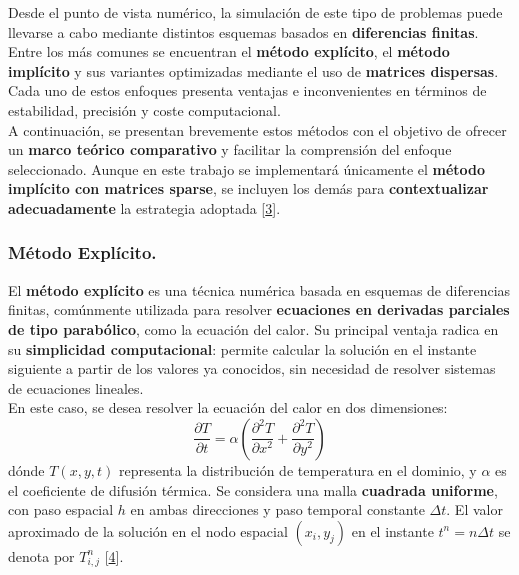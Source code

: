 \documentclass{article}
\begin{document}
Desde el punto de vista numérico, la simulación de este tipo de problemas puede llevarse a cabo mediante distintos esquemas basados en \textbf{diferencias finitas}. Entre los más comunes se encuentran el \textbf{método explícito}, el \textbf{método implícito} y sus variantes optimizadas mediante el uso de \textbf{matrices dispersas}. Cada uno de estos enfoques presenta ventajas e inconvenientes en términos de estabilidad, precisión y coste computacional.\\

A continuación, se presentan brevemente estos métodos con el objetivo de ofrecer un \textbf{marco teórico comparativo} y facilitar la comprensión del enfoque seleccionado. Aunque en este trabajo se implementará únicamente el \textbf{método implícito con matrices sparse}, se incluyen los demás para \textbf{contextualizar adecuadamente} la estrategia adoptada [\href{https://webs.um.es/gustavo.garrigos/tfg/Milonga_TFG_sept2020.pdf}{3}].

\subsubsection{Método Explícito.}
\label{subsubsec:me}
El \textbf{método explícito} es una técnica numérica basada en esquemas de diferencias finitas, comúnmente utilizada para resolver \textbf{ecuaciones en derivadas parciales de tipo parabólico}, como la ecuación del calor. Su principal ventaja radica en su \textbf{simplicidad computacional}: permite calcular la solución en el instante siguiente a partir de los valores ya conocidos, sin necesidad de resolver sistemas de ecuaciones lineales.\\

En este caso, se desea resolver la ecuación del calor en dos dimensiones:
\begin{equation}
\label{eq:or}
    \frac{\partial T}{\partial t} = \alpha \left( \frac{\partial^2 T}{\partial x^2} + \frac{\partial^2 T}{\partial y^2} \right)
\end{equation}
dónde $T(x, y, t)$ representa la distribución de temperatura en el dominio, y $\alpha$ es el coeficiente de difusión térmica. Se considera una malla \textbf{cuadrada uniforme}, con paso espacial $h$ en ambas direcciones y paso temporal constante $\Delta t$. El valor aproximado de la solución en el nodo espacial $(x_i, y_j)$ en el instante $t^n = n\Delta t$ se denota por $T_{i,j}^n$ [\href{https://personales.upv.es/dginesta/docencia/posgrado/prac_intro_edps.pdf}{4}].
\end{document}
